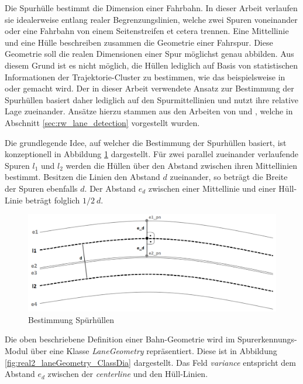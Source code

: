 Die Spurhülle bestimmt die Dimension einer Fahrbahn. In dieser Arbeit verlaufen sie idealerweise entlang
realer Begrenzungslinien, welche zwei Spuren voneinander oder eine Fahrbahn von einem Seitenstreifen et cetera trennen.
Eine Mittellinie und eine Hülle beschreiben zusammen die Geometrie einer Fahrspur. Diese Geometrie
soll die realen Dimensionen einer Spur möglichst genau abbilden. Aus diesem Grund ist es nicht möglich,
die Hüllen lediglich auf Basis von statistischen Informationen der Trajektorie-Cluster zu bestimmen,
wie das beispielsweise in \cite[]{WeimingHu2006} oder \cite[]{Morris2011} gemacht wird.
Der in dieser Arbeit verwendete Ansatz zur Bestimmung der Spurhüllen basiert daher lediglich auf den
Spurmittellinien und nutzt ihre relative Lage zueinander. Ansätze hierzu stammen aus den Arbeiten von
\cite[]{Hsieh2006} und \cite[]{Makris2005}, welche in Abschnitt \ref{sec:rw_lane_detection} vorgestellt wurden.

Die grundlegende Idee, auf welcher die Bestimmung der Spurhüllen basiert, ist konzeptionell in Abbildung
\ref{fig:real2_envelope_definition_concept} dargestellt.
Für zwei parallel zueinander verlaufende Spuren $l_1$ und $l_2$ werden die Hüllen über den Abstand zwischen
ihren Mittellinien bestimmt. Besitzen die Linien den Abstand $d$ zueinander, so beträgt die Breite
der Spuren ebenfalls $d$. Der Abstand $e_d$ zwischen einer Mittellinie und einer Hüll-Linie beträgt folglich
$1/2\ d$.

\begin{figure}[H]
    \centering
    \includegraphics[width=0.75\linewidth]{resources/img/umsetzung/U2/concept_lane_envelope}
    \caption{Bestimmung Spürhüllen}
    \label{fig:real2_envelope_definition_concept}
\end{figure}

Die oben beschriebene Definition einer Bahn-Geometrie wird im Spurerkennungs-Modul über eine Klasse
\textit{LaneGeometry} repräsentiert. Diese ist in Abbildung \ref{fig:real2_laneGeometry_ClassDia} dargestellt.
Das Feld \textit{variance} entspricht dem Abstand $e_d$ zwischen der \textit{centerline} und den Hüll-Linien.

